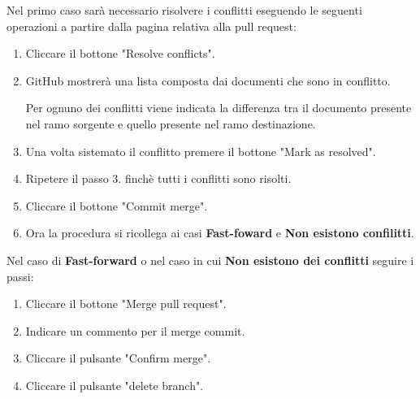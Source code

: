 \begin{enumerate}
    Nel primo caso sarà necessario risolvere i conflitti eseguendo le seguenti operazioni a partire dalla pagina relativa alla pull request:
    \begin{enumerate}
        \item Cliccare il bottone "Resolve conflicts".
        \item GitHub mostrerà una lista composta dai documenti che sono in conflitto.
        
        Per ognuno dei conflitti viene indicata la differenza tra il documento presente nel ramo sorgente e quello presente nel ramo destinazione.

        \item Una volta sistemato il conflitto premere il bottone "Mark as resolved".
        
        \item Ripetere il passo 3. finchè tutti i conflitti sono risolti.
        
        \item Cliccare il bottone "Commit merge".
        
        \item Ora la procedura si ricollega ai casi \textbf{Fast-foward} e \textbf{Non esistono confilitti}.
    \end{enumerate}    

    Nel caso di \textbf{Fast-forward} o nel caso in cui \textbf{Non esistono dei conflitti} seguire i passi:
    \begin{enumerate}
        \item Cliccare il bottone "Merge pull request".
        \item Indicare un commento per il merge commit.
        \item Cliccare il pulsante "Confirm merge".
        \item Cliccare il pulsante "delete branch".
    \end{enumerate}
\end{enumerate}


